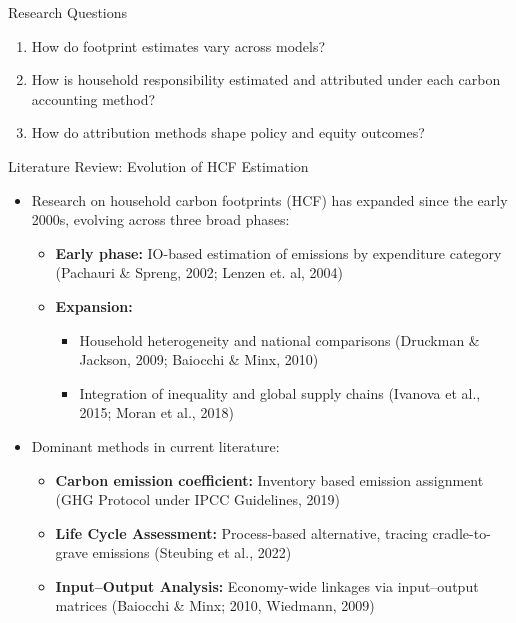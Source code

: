 \documentclass{beamer}
\begin{document}
\begin{frame}{Research Questions}
\begin{enumerate}
  \item How do footprint estimates vary across models?
 \pause
  \item How is household responsibility estimated and attributed under each carbon accounting method?
  \pause
  \item How do attribution methods shape policy and equity outcomes?
\end{enumerate}
\end{frame}

\begin{frame}{Literature Review: Evolution of HCF Estimation}
\footnotesize
\vspace{-2.5em}
\begin{itemize}
  \item Research on household carbon footprints (HCF) has expanded since the early 2000s, evolving across three broad phases:
  \begin{itemize}
    \footnotesize
    \item \textbf{Early phase:} IO-based estimation of emissions by expenditure category (Pachauri \& Spreng, 2002; Lenzen et. al, 2004)
    \pause
    \item \textbf{Expansion:} 
    \begin{itemize}
    \item Household heterogeneity and national comparisons (Druckman \& Jackson, 2009; Baiocchi \& Minx, 2010)
    \item Integration of inequality and global supply chains (Ivanova et al., 2015; Moran et al., 2018)
    \end{itemize}
  \end{itemize}
\pause
  \item Dominant methods in current literature:
 
  \begin{itemize}
    \pause
    \item  \footnotesize \textbf{Carbon emission coefficient:} Inventory based emission assignment (GHG Protocol under IPCC Guidelines, 2019)
    \pause
    \item \footnotesize \textbf{Life Cycle Assessment:} Process-based alternative, tracing cradle-to-grave emissions (Steubing et al., 2022)
    \pause 
    \item \footnotesize \textbf{Input–Output Analysis:} Economy-wide linkages via input–output matrices (Baiocchi \& Minx; 2010, Wiedmann, 2009)
  \end{itemize}
\end{itemize}
\end{frame}
\end{document}
